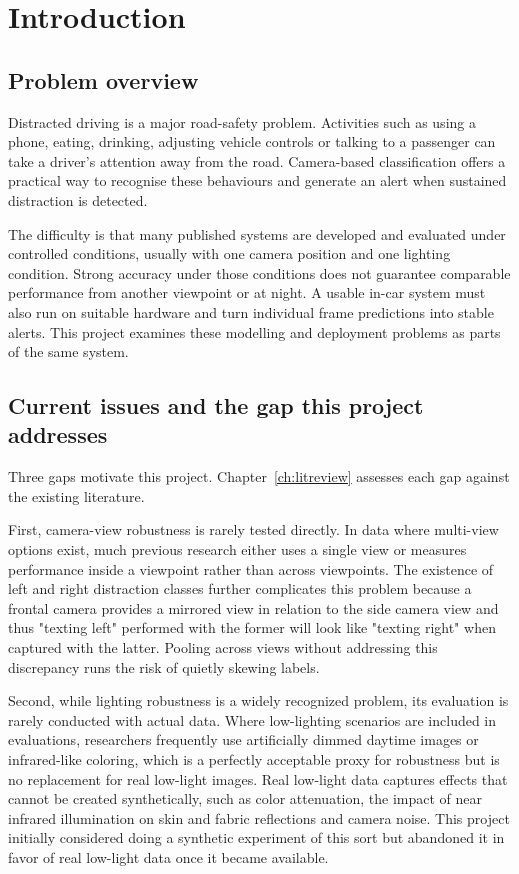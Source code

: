 
\chapter{Introduction}
\label{ch:introduction}

\section{Problem overview}

Distracted driving is a major road-safety problem. Activities such as using a phone, eating, drinking, adjusting vehicle controls or talking to a passenger can take a driver's attention away from the road. Camera-based classification offers a practical way to recognise these behaviours and generate an alert when sustained distraction is detected.

The difficulty is that many published systems are developed and evaluated under controlled conditions, usually with one camera position and one lighting condition. Strong accuracy under those conditions does not guarantee comparable performance from another viewpoint or at night. A usable in-car system must also run on suitable hardware and turn individual frame predictions into stable alerts. This project examines these modelling and deployment problems as parts of the same system.

\section{Current issues and the gap this project addresses}

Three gaps motivate this project. Chapter~\ref{ch:litreview} assesses each gap against the existing literature.

First, camera-view robustness is rarely tested directly. In data where multi-view options exist, much previous research either uses a single view or measures performance inside a viewpoint rather than across viewpoints. The existence of left and right distraction classes further complicates this problem because a frontal camera provides a mirrored view in relation to the side camera view and thus "texting left" performed with the former will look like "texting right" when captured with the latter. Pooling across views without addressing this discrepancy runs the risk of quietly skewing labels.

Second, while lighting robustness is a widely recognized problem, its evaluation is rarely conducted with actual data. Where low-lighting scenarios are included in evaluations, researchers frequently use artificially dimmed daytime images or infrared-like coloring, which is a perfectly acceptable proxy for robustness but is no replacement for real low-light images. Real low-light data captures effects that cannot be created synthetically, such as color attenuation, the impact of near infrared illumination on skin and fabric reflections and camera noise. This project initially considered doing a synthetic experiment of this sort but abandoned it in favor of real low-light data once it became available.

